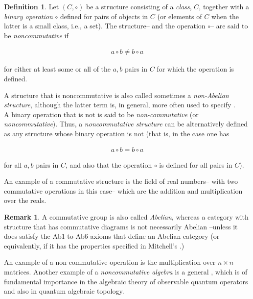 \documentclass[12pt]{article}
\theoremstyle{plain}
\theoremstyle{definition}
\newtheorem{definition}{Definition}[section]
\newtheorem{remark}{Remark}[section]
\numberwithin{equation}{section}
\begin{document}
\begin{definition}
Let $(C,\circ)$ be a structure consisting of a \emph{class}, $C$, together with a \emph{binary operation} $\circ$ defined for pairs of objects in $C$ (or elements of $C$ when the latter is a small class, i.e., a set). The structure-- and the operation $\circ$-- are said to be \emph{noncommutative} if

\begin{align}
a \circ b \neq b \circ a
\end{align}

for either at least some or all of the $a,b$ pairs in $C$ for which the operation is defined.  

A structure that is noncommutative is also called sometimes a \emph{non-Abelian structure}, although the latter term is, in general, more often used to specify .\\
A binary operation that is not  is said to be \emph{non-commutative} (or \emph{noncommutative}). Thus, a \emph{noncommutative structure} can be alternatively defined as any structure whose binary operation is not  (that is, in the  case one has  

\begin{align}
a \circ b = b \circ a
\end{align}

for all $a,b$ pairs in $C$, and also that the operation $\circ$ is defined for all pairs in $C$). 

\end{definition}

An example of a commutative structure is the field of real numbers-- with two commutative operations in this case--
which are the addition and multiplication over the reals.

\begin{remark} 
A commutative group is also called \emph{Abelian}, whereas a category with structure that has commutative diagrams is not necessarily Abelian --unless it does satisfy the Ab1 to Ab6 axioms that define an Abelian category (or equivalently, if it has the properties specified in Mitchell's  .)
\end{remark}

An example of a non-commutative operation is the multiplication over $n \times n$ matrices. 
Another example of a \emph{noncommutative algebra} is a general , which is of fundamental importance in the algebraic theory of observable quantum operators and also in quantum algebraic topology. 


\end{document}
